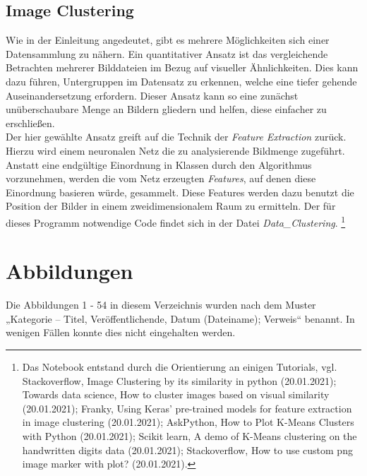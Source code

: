 \documentclass[a4paper,12pt,ngerman]{article}
\begin{document}
\subsection{Image Clustering}

Wie in der Einleitung angedeutet, gibt es mehrere Möglichkeiten sich einer Datensammlung zu nähern. Ein quantitativer Ansatz ist das vergleichende Betrachten mehrerer Bilddateien im Bezug auf visueller Ähnlichkeiten. Dies kann dazu führen, Untergruppen im Datensatz zu erkennen, welche eine tiefer gehende Auseinandersetzung erfordern. Dieser Ansatz kann so eine zunächst unüberschaubare Menge an Bildern gliedern und helfen, diese einfacher zu erschließen. \\
Der hier gewählte Ansatz greift auf die Technik der \textit{Feature Extraction} zurück. Hierzu wird einem neuronalen Netz die zu analysierende Bildmenge zugeführt. Anstatt eine endgültige Einordnung in Klassen durch den Algorithmus vorzunehmen, werden die vom Netz erzeugten \textit{Features}, auf denen diese Einordnung basieren würde, gesammelt. Diese Features werden dazu benutzt die Position der Bilder in einem zweidimensionalem Raum zu ermitteln. Der für dieses Programm notwendige Code findet sich in der Datei \textit{Data\_Clustering}. \footnote{Das Notebook entstand durch die Orientierung an einigen Tutorials, vgl. Stackoverflow, Image Clustering by its similarity in python (20.01.2021); Towards data science, How to cluster images based on visual similarity (20.01.2021); Franky, Using Keras' pre-trained models for feature extraction in image clustering (20.01.2021); AskPython, How to Plot K-Means Clusters with Python (20.01.2021); Scikit learn, A demo of K-Means clustering on the handwritten digits data (20.01.2021); Stackoverflow, How to use custom png image marker with plot? (20.01.2021).} \\

\newpage

\section{Abbildungen}
Die Abbildungen 1 - 54 in diesem Verzeichnis wurden nach dem Muster „Kategorie – Titel, Veröffentlichende, Datum (Dateiname); Verweis“ benannt. In wenigen Fällen konnte dies nicht eingehalten werden. \\
\end{document}
